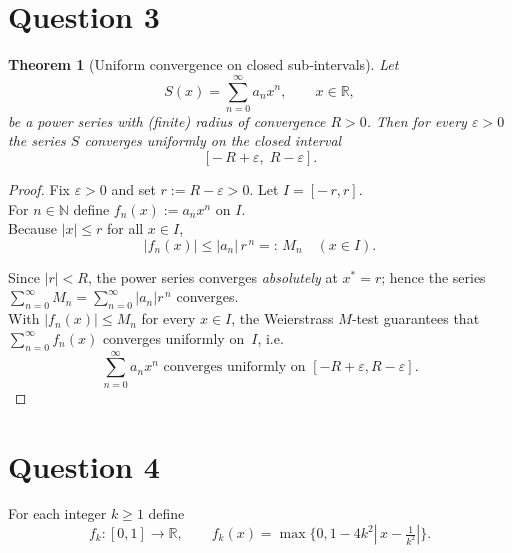 \documentclass[dvipsnames,12pt]{exam}
\newcommand{\R}{{\mathbb{R}}}
\newtheorem{theorem}{Theorem}[section]
\theoremstyle{definition}
\begin{document}
\newpage

\section{Question 3}

\begin{theorem}[Uniform convergence on closed sub‑intervals]\label{thm:innerUniform}
  Let \[ S(x)=\sum_{n=0}^{\infty} a_n x^{n}, \qquad x\in\R, \] be a power series with (finite) radius of convergence \(R>0\). Then for every \(\varepsilon>0\) the series \(S\) converges \emph{uniformly} on the closed interval \[ [-\,R+\varepsilon,\; R-\varepsilon]. \]
\end{theorem}
\begin{proof}
  Fix $\varepsilon>0$ and set $r:=R-\varepsilon>0$.  Let $I=[-\,r,r]$.\\

  For $n\in\mathbb N$ define $f_n(x):=a_n x^n$ on $I$.\\

  Because $|x|\le r$ for all $x\in I$, \[ |f_n(x)|\le |a_n|\,r^{\,n}=:\,M_n \quad (x\in I).
  \]

  Since $|r|<R$, the power series converges \emph{absolutely} at $x^\ast=r$; hence the series \(\sum_{n=0}^{\infty}M_n=\sum_{n=0}^{\infty}|a_n|r^{\,n}\) converges.\\

  With $|f_n(x)|\le M_n$ for every $x\in I$, the Weierstrass $M$‑test guarantees that \(\sum_{n=0}^{\infty}f_n(x)\) converges uniformly on $I$, i.e. \[ \sum_{n=0}^{\infty}a_n x^n \text{ converges uniformly on } [-R+\varepsilon,R-\varepsilon]. \]
\end{proof}

\newpage

\section{Question 4}

For each integer $k\ge1$ define
\[ f_k : [0,1] \longrightarrow \R, \qquad f_k(x)=\max\{0,1-4k^{2}|\,x-\tfrac{1}{k^{2}}|\}.\]
\end{document}
